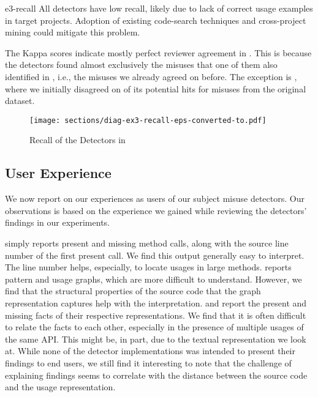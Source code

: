 \begin{obs}{e3-recall}
  All detectors have low recall, likely due to lack of correct usage examples in target projects.
  Adoption of existing code-search techniques and cross-project mining could mitigate this problem.
\end{obs}

The Kappa scores indicate mostly perfect reviewer agreement in .
This is because the detectors found almost exclusively the misuses that one of them also identified in , i.e., the misuses we already agreed on before.
The exception is \DMMC, where we initially disagreed on  of its  potential hits for misuses from the original \MUBench dataset.




\begin{figure}[tb]
  \centering
  \texttt{[image: sections/diag-ex3-recall-eps-converted-to.pdf]}
  \caption{Recall of the Detectors in }%
  \label{fig:recal-venn}
\end{figure}

\subsection{User Experience}

We now report on our experiences as users of our subject misuse detectors.
Our observations is based on the experience we gained while reviewing the detectors' findings in our experiments.

%
\DMMC simply reports present and missing method calls, along with the source line number of the first present call.
We find this output generally easy to interpret.
The line number helps, especially, to locate usages in large methods.
%
\GROUMiner reports pattern and usage graphs, which are more difficult to understand.
However, we find that the structural properties of the source code that the graph representation captures help with the interpretation.
%
\Jadet and \Tikanga report the present and missing facts of their respective representations.
We find that it is often difficult to relate the facts to each other, especially in the presence of multiple usages of the same API.
This might be, in part, due to the textual representation we look at.
%
While none of the detector implementations was intended to present their findings to end users, we still find it interesting to note that the challenge of explaining findings seems to correlate with the distance between the source code and the usage representation.

